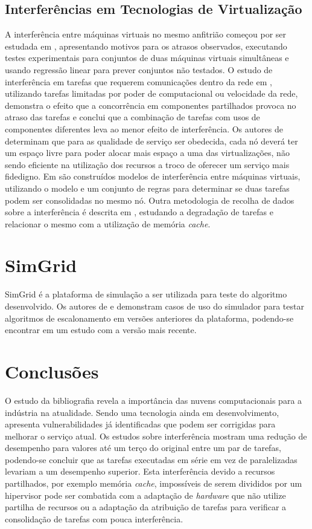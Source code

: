 \subsection{Interferências em Tecnologias de Virtualização}\label{sec:interferencia} 
A interferência entre máquinas virtuais no mesmo anfitrião começou por ser estudada em \cite{koh2007analysis}, apresentando motivos para os atrasos observados, executando testes experimentais para conjuntos de duas máquinas virtuais simultâneas e usando regressão linear para prever conjuntos não testados. O estudo de interferência em tarefas que requerem comunicações dentro da rede em \cite{pu2010understanding}, utilizando tarefas limitadas por poder de computacional ou velocidade da rede, demonstra o efeito que a concorrência em componentes partilhados provoca no atraso das tarefas e conclui que a combinação de tarefas com usos de componentes diferentes leva ao menor efeito de interferência. Os autores de \cite{nathuji2010q} determinam que para as qualidade de serviço ser obedecida, cada nó deverá ter um espaço livre para poder alocar mais espaço a uma das virtualizações, não sendo eficiente na utilização dos recursos a troco de oferecer um serviço mais fidedigno. Em \cite{zhu2012performance} são construídos modelos de interferência entre máquinas virtuais, utilizando o modelo e um conjunto de regras para determinar se duas tarefas podem ser consolidadas no mesmo nó. Outra metodologia de recolha de dados sobre a interferência é descrita em \cite{govindan2011cuanta}, estudando a degradação de tarefas e relacionar o mesmo com a utilização de memória \textit{cache}.



\section{SimGrid}\label{sec:simgrid} 
SimGrid é a plataforma de simulação a ser utilizada para teste do algoritmo desenvolvido. Os autores de \cite{casanova2001sg} e \cite{legrand2003sg} demonstram casos de uso do simulador para testar algoritmos de escalonamento em versões anteriores da plataforma, podendo-se encontrar em \cite{casanova2008sg} um estudo com a versão mais recente. 


\section{Conclusões}
O estudo da bibliografia revela a importância das nuvens computacionais para a indústria na atualidade. Sendo uma tecnologia ainda em desenvolvimento, apresenta vulnerabilidades já identificadas que podem ser corrigidas para melhorar o serviço atual. Os estudos sobre interferência mostram uma redução de desempenho para valores até um terço do original entre um par de tarefas, podendo-se concluir que as tarefas executadas em série em vez de paralelizadas levariam a um desempenho superior. Esta interferência devido a recursos partilhados, por exemplo memória \textit{cache}, impossíveis de serem divididos por um hipervisor pode ser combatida com a adaptação de \textit{hardware} que não utilize partilha de recursos ou a adaptação da atribuição de tarefas para verificar a consolidação de tarefas com pouca interferência. 


